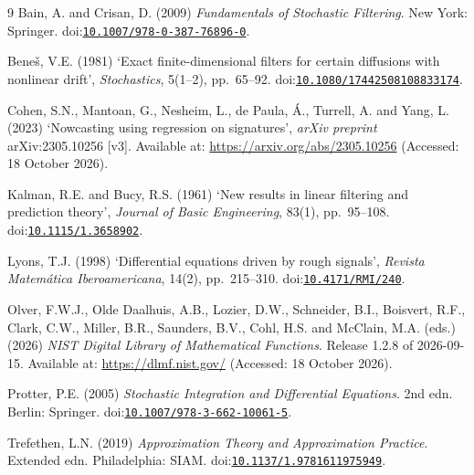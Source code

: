 \documentclass[11pt]{article}
\providecommand{\doi}[1]{doi:\href{https://doi.org/#1}{\nolinkurl{#1}}}
\theoremstyle{remark}
\begin{document}
\begin{thebibliography}{9}
Bain, A. and Crisan, D. (2009) \emph{Fundamentals of Stochastic Filtering}. New York: Springer.
\doi{10.1007/978-0-387-76896-0}.

Bene\v{s}, V.E. (1981) `Exact finite-dimensional filters for certain diffusions with nonlinear
drift', \emph{Stochastics}, 5(1--2), pp.~65--92. \doi{10.1080/17442508108833174}.

Cohen, S.N., Mantoan, G., Nesheim, L., de Paula, \'A., Turrell, A. and Yang, L. (2023)
`Nowcasting using regression on signatures', \emph{arXiv preprint} arXiv:2305.10256 [v3].
Available at: \url{https://arxiv.org/abs/2305.10256} (Accessed: 18 October 2026).

Kalman, R.E. and Bucy, R.S. (1961) `New results in linear filtering and prediction theory',
\emph{Journal of Basic Engineering}, 83(1), pp.~95--108. \doi{10.1115/1.3658902}.

Lyons, T.J. (1998) `Differential equations driven by rough signals', \emph{Revista Matem\'atica
Iberoamericana}, 14(2), pp.~215--310. \doi{10.4171/RMI/240}.

Olver, F.W.J., Olde Daalhuis, A.B., Lozier, D.W., Schneider, B.I., Boisvert, R.F., Clark, C.W.,
Miller, B.R., Saunders, B.V., Cohl, H.S. and McClain, M.A. (eds.) (2026) \emph{NIST Digital Library
of Mathematical Functions}. Release 1.2.8 of 2026-09-15. Available at: \url{https://dlmf.nist.gov/}
(Accessed: 18 October 2026).

Protter, P.E. (2005) \emph{Stochastic Integration and Differential Equations}. 2nd edn. Berlin:
Springer. \doi{10.1007/978-3-662-10061-5}.

Trefethen, L.N. (2019) \emph{Approximation Theory and Approximation Practice}. Extended edn.
Philadelphia: SIAM. \doi{10.1137/1.9781611975949}.
\end{thebibliography}
\end{document}
